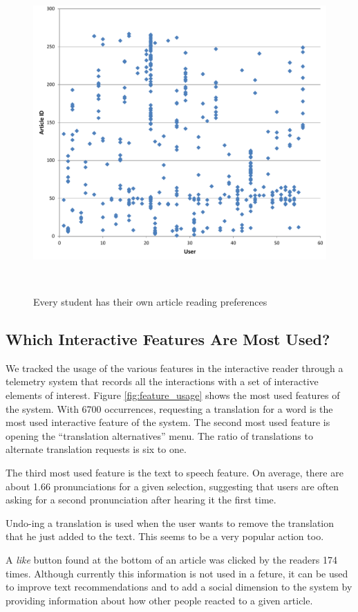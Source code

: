 \begin{figure}[h!]
\centering
  \includegraphics[width=0.8\columnwidth]{figures/users_articles}
  \caption{Every student has their own article reading preferences}~\label{fig:registrations}
\end{figure}

\subsection{Which Interactive Features Are Most Used?}
We tracked the usage of the various features in the interactive reader through a telemetry system that records all the interactions with a set of interactive elements of interest. Figure \ref{fig:feature_usage} shows the most used features of the system. With 6700 occurrences, requesting a translation for a word is the most used interactive feature of the system. The second most used feature is opening the ``translation alternatives'' menu. The ratio of translations to alternate translation requests is six to one. 

The third most used feature is the text to speech feature. On average, there are about 1.66 pronunciations for a given selection, suggesting that users are often asking for a second pronunciation after hearing it the first time. 

Undo-ing a translation is used when the user wants to remove the translation that he just added to the text. This seems to be a very popular action too. 

A {\em like} button found at the bottom of an article  was clicked by the readers 174 times. Although currently this information is not used in a feture, it can be used to improve text recommendations and to add a social dimension to the system by providing information about how other people reacted to a given article.

